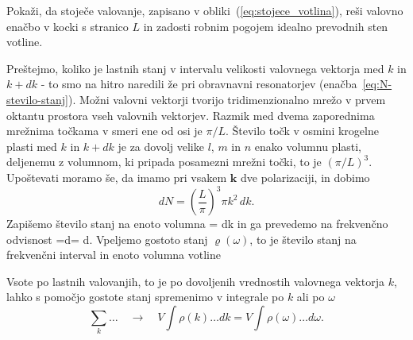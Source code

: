 \begin{definition}
 Pokaži, da stoječe valovanje, zapisano v obliki~(\ref{eq:stojece_votlina}), reši 
 valovno enačbo v kocki s stranico $L$ in zadosti robnim pogojem idealno prevodnih sten votline.
\end{definition}

Preštejmo, koliko je lastnih stanj v intervalu velikosti valovnega
vektorja med $k$ in $k+dk$ - to smo na hitro naredili že pri obravnavni
resonatorjev (enačba~\ref{eq:N-stevilo-stanj}). Možni valovni vektorji tvorijo tridimenzionalno
mrežo v prvem oktantu prostora vseh valovnih vektorjev. Razmik med
dvema zaporednima mrežnima točkama v smeri ene od osi je $\pi/L$.
Število točk v osmini krogelne plasti med $k$ in $k+dk$ je za dovolj
velike $l$, $m$ in $n$ enako volumnu plasti, deljenemu
z volumnom, ki pripada posamezni mrežni točki, to je $(\pi/L)^{3}$.
Upoštevati moramo še, da imamo pri vsakem $\mathbf{k}$ dve polarizaciji, in dobimo
\begin{equation}
dN=\left(\frac{L}{\pi}\right)^{3}\pi k^{2}\, dk.
\label{4.2}
\end{equation}
Zapišemo število stanj na enoto volumna
\beq
{}= dk
\label{4.3}
\eeq
in ga prevedemo na frekvenčno odvisnost
\beq
{}=d\nu = d\omega.
\eeq
Vpeljemo gostoto stanj  $\varrho (\omega)$, to je število stanj na frekvenčni interval in enoto volumna 
votline

Vsote po lastnih valovanjih, to je po dovoljenih vrednostih valovnega vektorja $k$,
lahko s pomočjo gostote stanj spremenimo v integrale po $k$ ali po $\omega$
\begin{equation}
\sum_{k}\ldots \quad \rightarrow \quad V\int\rho(k)\ldots dk=V\int\rho(\omega)\ldots d\omega.
\label{4.5}
\end{equation}

